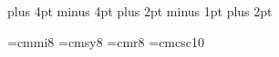 %
%
 \hsize=5.91in \vsize=8.18in    %
\parindent=20pt \parskip=4pt plus 4pt minus 4pt
\baselineskip=13pt plus 2pt minus 1pt \lineskiplimit=2pt
\lineskip=2pt plus 2pt 			%

\font\eightmi=cmmi8 \font\eightsy=cmsy8
\font\rmeight=cmr8  \def\rmVIII{\rmeight \baselineskip=10pt
 plus 2pt minus 1pt \lineskiplimit=2pt \lineskip=2pt plus 1pt
 \parskip=0pt \textfont0=\rmeight \textfont1=\eightmi \textfont2=\eightsy
 \def\strut{\vrule height 7.5pt depth 2.5pt width 0pt}}
\font\caps=cmcsc10


%





